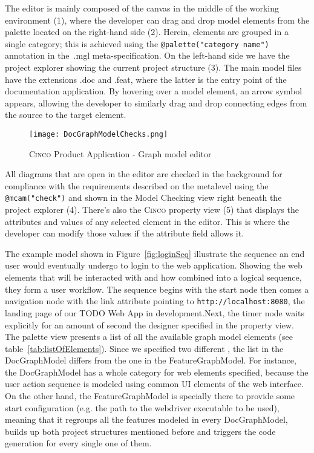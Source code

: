 The editor is mainly composed of the canvas in the middle of the working environment (1), where the developer can drag and drop model elements from the palette located on the right-hand side (2). Herein, elements are grouped in a single category; this is achieved using the \lstinline[language=MGL]{@palette("category name")} annotation in the~.mgl meta-specification. On the left-hand side we have the project explorer showing the current project structure (3). The main model files have the extensions .doc and .feat, where the latter is the entry point of the documentation application. By hovering over a model element, an arrow symbol appears, allowing the developer to similarly drag and drop connecting edges from the source to the target element.

\begin{figure}[h]
    \centering
    \texttt{[image: DocGraphModelChecks.png]}
    \caption{\textsc{Cinco} Product Application - Graph model editor}\label{fig:graphDSL}
\end{figure}

All diagrams that are open in the editor are checked in the background for compliance with the requirements described on the metalevel using the \lstinline[language=MGL]{@mcam("check")} and shown in the Model Checking view right beneath the project explorer (4). There's also the \textsc{Cinco} property view (5) that displays the attributes and values of any selected element in the editor. This is where the developer can modify those values if the attribute field allows it.

The example model shown in Figure~\ref{fig:loginSeq} illustrate the sequence an end user would eventually undergo to login to the web application. Showing the web elements that will be interacted with and how combined into a logical sequence, they form a user workflow. The sequence begins with the start node then comes a navigation node with the link attribute pointing to \lstinline{http://localhost:8080}, the landing page of our TODO Web App in development.Next, the timer node waits explicitly for an amount of second the designer specified in the property view. The palette view presents a list of all the available graph model elements (see table~\ref{tab:listOfElements}). Since we specified two different , the list in the DocGraphModel differs from the one in the FeatureGraphModel. For instance, the DocGraphModel has a whole category for web elements specified, because the user action sequence is modeled using common UI elements of the web interface. On the other hand, the FeatureGraphModel is specially there to provide some start configuration (e.g. the path to the webdriver executable to be used), meaning that it regroups all the features modeled in every DocGraphModel, builds up both project structures mentioned before and triggers the code generation for every single one of them.

